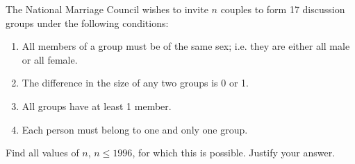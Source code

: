 The National Marriage Council wishes to invite $n$ couples to form 17 discussion groups under the following conditions:
\begin{enumerate}
	\item All members of a group must be of the same sex; i.e. they are either all male or all female.
	\item The difference in the size of any two groups is 0 or 1.
	\item All groups have at least 1 member.
	\item Each person must belong to one and only one group.
\end{enumerate}
Find all values of $n$, $n \leq 1996$, for which this is possible. Justify your answer.